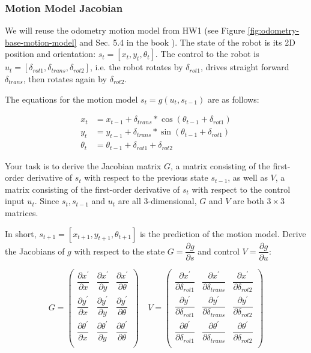 \documentclass[tp]{lcc}
\begin{document}
\subsubsection{Motion Model Jacobian}
We will reuse the odometry motion model from HW1 (see Figure \ref{fig:odometry-base-motion-model} and Sec. 5.4 in the book \cite{thrun2005probabilistic}). The state of the robot is its 2D position and orientation: $s_{t}=[x_{t},y_{t},\theta_{t}]$. The control to the robot is $u_{t}=[\delta_{rot1},\delta_{trans},\delta_{rot2}]$, i.e. the robot rotates by $\delta_{rot1}$, drives straight forward $\delta_{trans}$, then rotates again by $\delta_{rot2}$.

The equations for the motion model $s_{t}=g(u_{t},s_{t-1})$ are as follows:

\begin{align*}
    x_{t} &= x_{t-1}+\delta_{trans}*\cos(\theta_{t-1}+\delta_{rot1}) \\
    y_{t} &= y_{t-1}+\delta_{trans}*\sin(\theta_{t-1}+\delta_{rot1}) \\
    \theta_{t} &= \theta_{t-1}+\delta_{rot1}+\delta_{rot2}
\end{align*}

Your task is to derive the Jacobian matrix $G$, a matrix consisting of the first-order derivative of $s_{t}$ with respect to the previous state $s_{t-1}$, as well as $V$, a matrix consisting of the first-order derivative of $s_{t}$ with respect to the control input $u_{t}$. Since $s_{t},s_{t-1}$ and $u_{t}$ are all 3-dimensional, $G$ and $V$ are both $3\times 3$ matrices.

In short, $s_{t+1}=[x_{t+1},y_{t+1},\theta_{t+1}]$ is the prediction of the motion model. Derive the Jacobians of $g$ with respect to the state $G=\dfrac{\partial g}{\partial s}$ and control $V=\dfrac{\partial g}{\partial u}$:

\[
G=\begin{pmatrix}
\dfrac{\partial x^{\prime}}{\partial x} & \dfrac{\partial x^{\prime}}{\partial y} & \dfrac{\partial x^{\prime}}{\partial \theta} \\
\dfrac{\partial y^{\prime}}{\partial x} & \dfrac{\partial y^{\prime}}{\partial y} & \dfrac{\partial y^{\prime}}{\partial \theta} \\
\dfrac{\partial \theta^{\prime}}{\partial x} & \dfrac{\partial \theta^{\prime}}{\partial y} & \dfrac{\partial \theta^{\prime}}{\partial \theta} \\
\end{pmatrix}
\quad
V=\begin{pmatrix}
\dfrac{\partial x^{\prime}}{\partial \delta_{rot1}} & \dfrac{\partial x^{\prime}}{\partial \delta_{trans}} & \dfrac{\partial x^{\prime}}{\partial \delta_{rot2}} \\
\dfrac{\partial y^{\prime}}{\partial \delta_{rot1}} & \dfrac{\partial y^{\prime}}{\partial \delta_{trans}} & \dfrac{\partial y^{\prime}}{\partial \delta_{rot2}} \\
\dfrac{\partial \theta^{\prime}}{\partial \delta_{rot1}} & \dfrac{\partial \theta^{\prime}}{\partial \delta_{trans}} & \dfrac{\partial \theta^{\prime}}{\partial \delta_{rot2}} \\
\end{pmatrix}
\]
\end{document}

